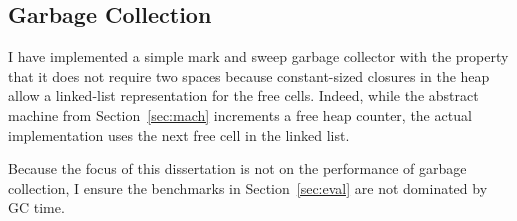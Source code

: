 \subsection{Garbage Collection}

I have implemented a simple mark and sweep garbage collector with the property
that it does not require two spaces because constant-sized closures in the
heap allow a linked-list representation for the free cells. Indeed,
while the abstract machine from Section~\ref{sec:mach} increments a free heap
counter, the actual implementation uses the next free cell in the linked list.

Because the focus of this dissertation is not on the performance of garbage
collection, I ensure the benchmarks in Section~\ref{sec:eval} are not dominated
by GC time.

